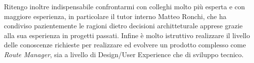 Ritengo inoltre indispensabile confrontarmi con colleghi molto più esperta e con maggiore esperienza, in particolare il tutor interno Matteo Ronchi, che ha condiviso pazientemente le ragioni dietro decisioni architteturale apprese grazie alla sua esperienza in progetti passati. 
Infine è molto istruttivo realizzare il livello delle conoscenze richieste per realizzare ed evolvere un prodotto complesso come \textit{Route Manager}, sia a livello di Design/User Experience che di sviluppo tecnico.

